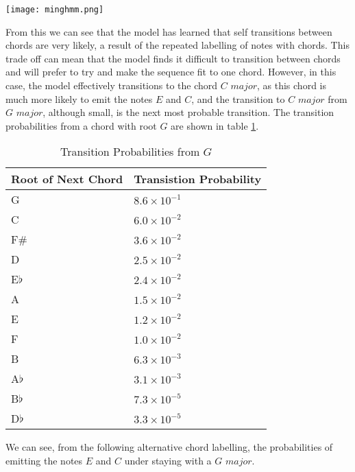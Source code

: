 \documentclass[bsc,singlespacing,logo, parskip, deptreport]{infthesis}
\begin{document}
\begin{center}
  \texttt{[image: minghmm.png]}
\end{center}

From this we can see that the model has learned that self transitions between chords are very likely, a result of the repeated labelling of notes with chords. This trade off can mean that the model finds it difficult to transition between chords and will prefer to try and make the sequence fit to one chord. However, in this case, the model effectively transitions to the chord $C$ $major$, as this chord is much more likely to emit the notes $E$ and $C$, and the transition to $C$ $major$ from $G$ $major$, although small, is the next most probable transition. The transition probabilities from a chord with root $G$ are shown in table \ref{trans}.

\begin{table}[h!]
  \centering
  \caption{Transition Probabilities from $G$}
  \label{trans}
  \begin{tabular}{l|l}
    Root of Next Chord          & Transistion Probability \\ \hline
    G                   & $8.6 \times 10^{-1}$          \\
    C                   & $6.0 \times 10^{-2}$          \\
    F$\#$               & $3.6 \times 10^{-2}$          \\
    D                   & $2.5 \times 10^{-2}$          \\
    E$\flat$            & $2.4 \times 10^{-2}$          \\
    A                   & $1.5 \times 10^{-2}$          \\
    E                   & $1.2 \times 10^{-2}$          \\
    F                   & $1.0 \times 10^{-2}$          \\
    B                   & $6.3 \times 10^{-3}$          \\
    A$\flat$            & $3.1 \times 10^{-3}$          \\
    B$\flat$            & $7.3 \times 10^{-5}$          \\
    D$\flat$            & $3.3 \times 10^{-5}$
  \end{tabular}
\end{table}

We can see, from the following alternative chord labelling, the probabilities of emitting the notes $E$ and $C$ under staying with a $G$ $major$.
\end{document}
